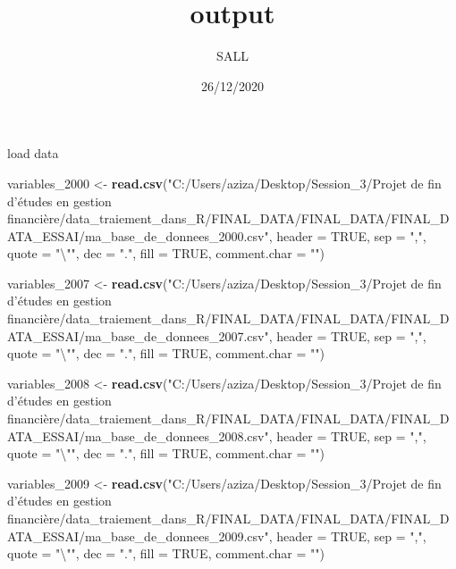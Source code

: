 \documentclass[
]{article}
\title{output}
\author{SALL}
\date{26/12/2020}
\newenvironment{Shaded}{\begin{snugshade}}{\end{snugshade}}
\newcommand{\CharTok}[1]{\textcolor[rgb]{0.31,0.60,0.02}{#1}}
\newcommand{\DataTypeTok}[1]{\textcolor[rgb]{0.13,0.29,0.53}{#1}}
\newcommand{\DecValTok}[1]{\textcolor[rgb]{0.00,0.00,0.81}{#1}}
\newcommand{\KeywordTok}[1]{\textcolor[rgb]{0.13,0.29,0.53}{\textbf{#1}}}
\newcommand{\NormalTok}[1]{#1}
\newcommand{\OtherTok}[1]{\textcolor[rgb]{0.56,0.35,0.01}{#1}}
\newcommand{\StringTok}[1]{\textcolor[rgb]{0.31,0.60,0.02}{#1}}
\begin{document}
\maketitle

load data

\begin{Shaded}
\begin{Highlighting}[]
\NormalTok{variables_}\DecValTok{2000}\NormalTok{ <-}\StringTok{ }\KeywordTok{read.csv}\NormalTok{(}\StringTok{"C:/Users/aziza/Desktop/Session_3/Projet de fin d'études en gestion financière/data_traiement_dans_R/FINAL_DATA/FINAL_DATA/FINAL_DATA_ESSAI/ma_base_de_donnees_2000.csv"}\NormalTok{, }
                           \DataTypeTok{header =} \OtherTok{TRUE}\NormalTok{, }\DataTypeTok{sep =} \StringTok{","}\NormalTok{, }\DataTypeTok{quote =} \StringTok{"}\CharTok{\textbackslash{}"}\StringTok{"}\NormalTok{,}
                           \DataTypeTok{dec =} \StringTok{"."}\NormalTok{, }\DataTypeTok{fill =} \OtherTok{TRUE}\NormalTok{, }\DataTypeTok{comment.char =} \StringTok{""}\NormalTok{)}


\NormalTok{variables_}\DecValTok{2007}\NormalTok{ <-}\StringTok{ }\KeywordTok{read.csv}\NormalTok{(}\StringTok{"C:/Users/aziza/Desktop/Session_3/Projet de fin d'études en gestion financière/data_traiement_dans_R/FINAL_DATA/FINAL_DATA/FINAL_DATA_ESSAI/ma_base_de_donnees_2007.csv"}\NormalTok{, }
                           \DataTypeTok{header =} \OtherTok{TRUE}\NormalTok{, }\DataTypeTok{sep =} \StringTok{","}\NormalTok{, }\DataTypeTok{quote =} \StringTok{"}\CharTok{\textbackslash{}"}\StringTok{"}\NormalTok{,}
                           \DataTypeTok{dec =} \StringTok{"."}\NormalTok{, }\DataTypeTok{fill =} \OtherTok{TRUE}\NormalTok{, }\DataTypeTok{comment.char =} \StringTok{""}\NormalTok{)}


\NormalTok{variables_}\DecValTok{2008}\NormalTok{ <-}\StringTok{ }\KeywordTok{read.csv}\NormalTok{(}\StringTok{"C:/Users/aziza/Desktop/Session_3/Projet de fin d'études en gestion financière/data_traiement_dans_R/FINAL_DATA/FINAL_DATA/FINAL_DATA_ESSAI/ma_base_de_donnees_2008.csv"}\NormalTok{, }
                           \DataTypeTok{header =} \OtherTok{TRUE}\NormalTok{, }\DataTypeTok{sep =} \StringTok{","}\NormalTok{, }\DataTypeTok{quote =} \StringTok{"}\CharTok{\textbackslash{}"}\StringTok{"}\NormalTok{,}
                           \DataTypeTok{dec =} \StringTok{"."}\NormalTok{, }\DataTypeTok{fill =} \OtherTok{TRUE}\NormalTok{, }\DataTypeTok{comment.char =} \StringTok{""}\NormalTok{)}


\NormalTok{variables_}\DecValTok{2009}\NormalTok{ <-}\StringTok{ }\KeywordTok{read.csv}\NormalTok{(}\StringTok{"C:/Users/aziza/Desktop/Session_3/Projet de fin d'études en gestion financière/data_traiement_dans_R/FINAL_DATA/FINAL_DATA/FINAL_DATA_ESSAI/ma_base_de_donnees_2009.csv"}\NormalTok{, }
                           \DataTypeTok{header =} \OtherTok{TRUE}\NormalTok{, }\DataTypeTok{sep =} \StringTok{","}\NormalTok{, }\DataTypeTok{quote =} \StringTok{"}\CharTok{\textbackslash{}"}\StringTok{"}\NormalTok{,}
                           \DataTypeTok{dec =} \StringTok{"."}\NormalTok{, }\DataTypeTok{fill =} \OtherTok{TRUE}\NormalTok{, }\DataTypeTok{comment.char =} \StringTok{""}\NormalTok{)}



\end{Highlighting}
\end{Shaded}
\end{document}
